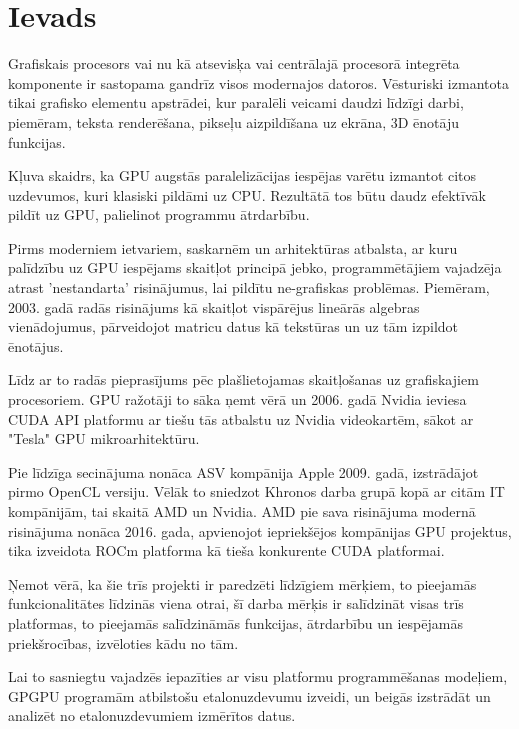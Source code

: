 \documentclass[12pt]{report}%
\theoremstyle{definition}
\begin{document}
\chapter{Ievads}
Grafiskais procesors vai nu kā atsevisķa vai centrālajā procesorā integrēta
komponente ir sastopama gandrīz visos modernajos datoros. Vēsturiski izmantota
tikai grafisko elementu apstrādei, kur paralēli veicami daudzi līdzīgi darbi,
piemēram, teksta renderēšana, pikseļu aizpildīšana uz ekrāna, 3D ēnotāju
funkcijas.

Kļuva skaidrs, ka GPU augstās paralelizācijas iespējas varētu izmantot citos
uzdevumos, kuri klasiski pildāmi uz CPU. Rezultātā tos būtu daudz efektīvāk
pildīt uz GPU, palielinot programmu ātrdarbību.

Pirms moderniem ietvariem, saskarnēm un arhitektūras atbalsta, ar kuru
palīdzību uz GPU iespējams skaitļot principā jebko, programmētājiem vajadzēja
atrast 'nestandarta' risinājumus, lai pildītu ne-grafiskas problēmas. Piemēram,
2003. gadā radās risinājums kā skaitļot vispārējus lineārās algebras
vienādojumus, pārveidojot matricu datus kā tekstūras un uz tām izpildot
ēnotājus. \cite{10.1145/882262.882363}

Līdz ar to radās pieprasījums pēc plašlietojamas skaitļošanas uz grafiskajiem
procesoriem. GPU ražotāji to sāka ņemt vērā un 2006. gadā Nvidia ieviesa CUDA
API platformu ar tiešu tās atbalstu uz Nvidia  videokartēm, sākot ar "Tesla"
GPU mikroarhitektūru.\cite{nvidia_tesla_p100}

Pie līdzīga secinājuma nonāca ASV kompānija Apple 2009. gadā, izstrādājot pirmo
OpenCL versiju. Vēlāk to sniedzot Khronos darba grupā kopā ar citām IT
kompānijām, tai skaitā AMD un Nvidia. \cite{khronos_proposal} AMD pie sava 
risinājuma modernā risinājuma nonāca 2016. gada, apvienojot iepriekšējos
kompānijas GPU projektus, tika izveidota ROCm platforma kā tieša konkurente
CUDA platformai.

Ņemot vērā, ka šie trīs projekti ir paredzēti līdzīgiem mērķiem, to pieejamās
funkcionalitātes līdzinās viena otrai, šī darba mērķis ir salīdzināt visas trīs
platformas, to pieejamās salīdzināmās funkcijas, ātrdarbību un iespējamās
priekšrocības, izvēloties kādu no tām.

Lai to sasniegtu vajadzēs iepazīties ar visu platformu programmēšanas modeļiem,
GPGPU programām atbilstošu etalonuzdevumu izveidi, un beigās izstrādāt un
analizēt no etalonuzdevumiem izmērītos datus.







\end{document}

